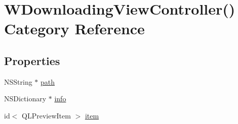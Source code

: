\hypertarget{category_w_downloading_view_controller_07_08}{\section{W\-Downloading\-View\-Controller() Category Reference}
\label{category_w_downloading_view_controller_07_08}
}
\subsection*{Properties}
\begin{DoxyCompactItemize}
\item 
N\-S\-String $\ast$ \hyperlink{category_w_downloading_view_controller_07_08_a7eb39305dddb862399ada719b2edef18}{path}
\item 
N\-S\-Dictionary $\ast$ \hyperlink{category_w_downloading_view_controller_07_08_a26fdaf83a5eb92aaaab2d0c742ea4ce2}{info}
\item 
id$<$ Q\-L\-Preview\-Item $>$ \hyperlink{category_w_downloading_view_controller_07_08_a4774edbb2b24bef307f42c7a6a1fac2a}{item}
\end{DoxyCompactItemize}


